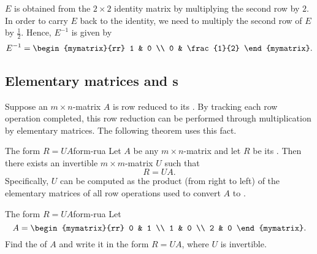 \begin{solution}
  $E$ is obtained from the $2\times 2$ identity matrix by multiplying
  the second row by $2$. In order to carry $E$ back to the identity,
  we need to multiply the second row of $E$ by $\frac{1}{2}$.  Hence,
  $E^{-1}$ is given by
  \begin{equation*}
    E^{-1}
    =
    \begin{mymatrix}{rr}
      1 & 0 \\
      0 & \frac{1}{2}
    \end{mymatrix}.
  \end{equation*}
\end{solution}

\subsection{Elementary matrices and {\rref}s}

Suppose an $m\times n$-matrix $A$ is row reduced to its {\rref}. By
tracking each row operation completed, this row reduction can be
performed through multiplication by elementary matrices. The following
theorem uses this fact.

\begin{theorem}{The form $R=UA$}{form-rua}
  Let $A$ be any $m\times n$-matrix and let $R$ be its {\rref}. Then
  there exists an invertible $m\times m$-matrix $U$ such that
  \begin{equation*}
    R=UA.
  \end{equation*}
  Specifically, $U$ can be computed as the product (from right to
  left) of the elementary matrices of all row operations used to
  convert $A$ to {\rref}.
\end{theorem}

\begin{example}{The form $R=UA$}{form-rua}
  Let
  \begin{equation*}
    A = \begin{mymatrix}{rr}
      0 & 1 \\
      1 & 0 \\
      2 & 0
    \end{mymatrix}.
  \end{equation*}
  Find the {\rref} of $A$ and write it in the form $R=UA$, where $U$
  is invertible.
\end{example}

